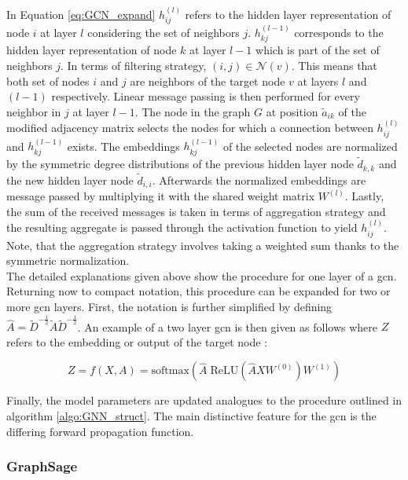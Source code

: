 	\noindent In Equation \ref{eq:GCN_expand} $h_{ij}^{(l)}$ refers to the 
	hidden layer representation of node $i$ at layer $l$ considering the set of
	neighbors $j$. $h_{kj}^{(l-1)}$ corresponds to the hidden layer
	representation of node $k$ at layer $l-1$ which is part of the set of 
	neighbors $j$. In terms of filtering strategy, $(i,j) \in \mathcal{N}(v)$. 
	This means that both set of nodes $i$ and $j$ are neighbors of the target 
	node $v$ at layers $l$ and $(l-1)$ respectively. Linear message
	passing is then performed for every neighbor in $j$ at layer $l-1$. The node 
	in the graph $G$ at position $\tilde a_{ik}$ of the modified adjacency matrix 
	selects the nodes for which a connection between $h_{ij}^{(l)}$ and
	$h_{kj}^{(l-1)}$ exists. The embeddings $h_{kj}^{(l-1)}$ of the selected 
	nodes are normalized by the symmetric degree distributions of the previous 
	hidden layer node $\tilde d_{k,k}$ and the new hidden layer node $\tilde d_{i,i}$.
	Afterwards the normalized embeddings are message passed by multiplying it
	with the shared weight matrix $W^{(l)}$. Lastly, the sum of the received
	messages is taken in terms of aggregation strategy and the resulting
	aggregate is passed through the activation function to yield $h_{ij}^{(l)}$.
	Note, that the aggregation strategy involves taking a weighted sum thanks
	to the symmetric normalization. \\

	\noindent The detailed explanations given above show the procedure for
	one layer of a \acs{gcn}. Returning now to compact notation, this procedure 
	can be expanded for two or more \acs{gcn} layers. First, the notation is 
	further simplified by defining $\hat A = \tilde D^{-\frac{1}{2}}\tilde A \tilde
	D^{-\frac{1}{2}}$. An example of a two layer \acs{gcn} is then given as 
	follows where $Z$ refers to the embedding or output of the target node 
	\citep[p. 3]{kipf2016semi}:

	\begin{equation}
		Z = f(X,A) = \text{softmax}\left(\hat A \;\text{ReLU}\left(\hat A X
		W^{(0)}\right)W^{(1)}\right)
	\label{eq:GCN_forward}
	\end{equation}

	\noindent Finally, the model parameters are updated analogues to the
	procedure outlined in algorithm \ref{algo:GNN_struct}. The main distinctive
	feature for the \acs{gcn} is the differing forward propagation function. 

	\subsubsection{GraphSage}
	\label{section:theory_graphsage}
	
